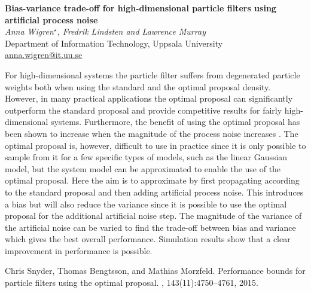 \documentclass[12pt]{article}
\newcommand{\postertitle}[1]{{\Large\bf #1}\\[12pt]}
\newcommand{\authors}[1]{\emph{#1}\\}
\newcommand{\affiliations}[1]{{#1}\\}
\newcommand{\contacts}[1]{{#1}}
\begin{document}
\begin{center}
\vspace*{0.5cm}
%
\postertitle{Bias-variance trade-off for high-dimensional particle filters using artificial process noise}
%
\authors{Anna Wigren$^\star$, Fredrik Lindsten and Lawrence Murray } %
% 
\affiliations{Department of Information Technology, Uppsala University}
%
\contacts{\url{anna.wigren@it.uu.se}} %
%
\vspace*{0.3cm}
\end{center}

For high-dimensional systems the particle filter suffers from degenerated particle weights both when using the standard and the optimal proposal density. However, in many practical applications the optimal proposal can significantly outperform the standard proposal and provide competitive results for fairly high-dimensional systems. Furthermore, the benefit of using the optimal proposal has been shown to increase when the magnitude of the process noise increases \cite{label}. The optimal proposal is, however, difficult to use in practice since it is only possible to sample from it for a few specific types of models, such as the linear Gaussian model, but the system model can be approximated to enable the use of the optimal proposal. Here the aim is to approximate by first propagating according to the standard proposal and then adding artificial process noise. This introduces a bias but will also reduce the variance since it is possible to use the optimal proposal for the additional artificial noise step. The magnitude of the variance of the artificial noise can be varied to find the trade-off between bias and variance which gives the best overall performance. Simulation results show that a clear improvement in performance is possible. 


\begin{thebibliography}{1}	
	Chris Snyder, Thomas Bengtsson, and Mathias Morzfeld.
	\newblock Performance bounds for particle filters using the optimal proposal.
	, 143(11):4750--4761, 2015.	
\end{thebibliography}
\end{document}
